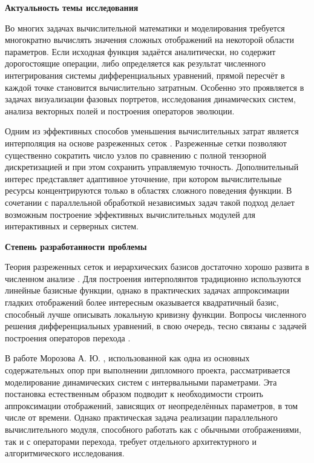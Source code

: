 \textbf{Актуальность темы исследования}

Во многих задачах вычислительной математики и моделирования требуется многократно вычислять значения сложных отображений на некоторой области параметров. Если исходная функция задаётся аналитически, но содержит дорогостоящие операции, либо определяется как результат численного интегрирования системы дифференциальных уравнений, прямой пересчёт в каждой точке становится вычислительно затратным. Особенно это проявляется в задачах визуализации фазовых портретов, исследования динамических систем, анализа векторных полей и построения операторов эволюции.

Одним из эффективных способов уменьшения вычислительных затрат является интерполяция на основе разреженных сеток \cite{Bungartz2004,Zenger1991}. Разреженные сетки позволяют существенно сократить число узлов по сравнению с полной тензорной дискретизацией и при этом сохранить управляемую точность. Дополнительный интерес представляет адаптивное уточнение, при котором вычислительные ресурсы концентрируются только в областях сложного поведения функции. В сочетании с параллельной обработкой независимых задач такой подход делает возможным построение эффективных вычислительных модулей для интерактивных и серверных систем.

\textbf{Степень разработанности проблемы}

Теория разреженных сеток и иерархических базисов достаточно хорошо развита в численном анализе \cite{Bungartz2004,Zenger1991,Quarteroni2007}. Для построения интерполянтов традиционно используются линейные базисные функции, однако в практических задачах аппроксимации гладких отображений более интересным оказывается квадратичный базис, способный лучше описывать локальную кривизну функции. Вопросы численного решения дифференциальных уравнений, в свою очередь, тесно связаны с задачей построения операторов перехода \cite{Hairer1993,Stoer2002}.

В работе Морозова А. Ю. \cite{Morozov2024}, использованной как одна из основных содержательных опор при выполнении дипломного проекта, рассматривается моделирование динамических систем с интервальными параметрами. Эта постановка естественным образом подводит к необходимости строить аппроксимации отображений, зависящих от неопределённых параметров, в том числе от времени. Однако практическая задача реализации параллельного вычислительного модуля, способного работать как с обычными отображениями, так и с операторами перехода, требует отдельного архитектурного и алгоритмического исследования.

